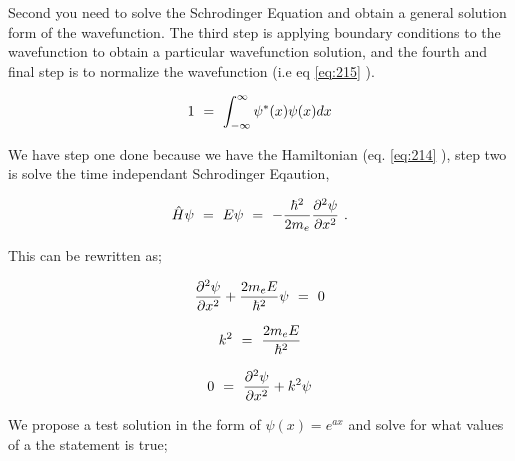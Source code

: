 \documentclass{article}
\begin{document}
Second you need to solve the Schrodinger Equation and obtain a general solution form of the wavefunction. The third step is applying boundary conditions to the wavefunction to obtain a particular wavefunction solution, and the fourth and final step is to normalize the wavefunction (i.e eq \ref{eq:215} ).

\begin{equation} \label{eq:215}
1 \hspace{0.125cm} = \hspace{0.125cm} \int_{-\infty}^{\infty} \psi^\ast(x) \psi(x) dx
\end{equation} 

We have step one done because we have the Hamiltonian (eq. \ref{eq:214} ), step two is solve the time independant Schrodinger Eqaution,

\begin{equation} \label{eq:216}
\hat{H}\psi \hspace{0.125cm} = \hspace{0.125cm} E\psi  \hspace{0.125cm} = \hspace{0.125cm} -\frac{\hbar^2}{2m_e}\frac{\partial^2{\psi}}{\partial{x^2}} \hspace{0.125cm} .
\end{equation} 

This can be rewritten as; 

\begin{equation} \label{eq:217}
\frac{\partial^2{\psi}}{\partial{x^2}} + \frac{2m_e E}{\hbar^2} \psi \hspace{0.125cm} = \hspace{0.125cm} 0  
\end{equation}

\begin{equation} \label{eq:218}
k^2 \hspace{0.125cm} = \hspace{0.125cm} \frac{2m_e E}{\hbar^2}
\end{equation}

\begin{equation} \label{eq:219}
0 \hspace{0.125cm} = \hspace{0.125cm} \frac{\partial^2{\psi}}{\partial{x^2}} + k^2 \psi  
\end{equation}

We propose a test solution in the form of \begin{math} \psi(x) = e^{ax}  \end{math} and solve for what values of a the statement is true; 
\end{document}
